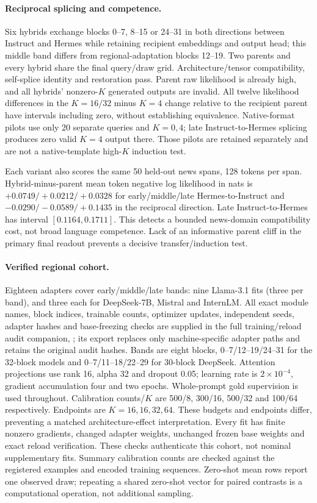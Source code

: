 \paragraph{Reciprocal splicing and competence.} Six hybrids exchange blocks 0--7, 8--15 or 24--31 in both directions between Instruct and Hermes while retaining recipient embeddings and output head; this middle band differs from regional-adaptation blocks 12--19. Two parents and every hybrid share the final query/draw grid. Architecture/tensor compatibility, self-splice identity and restoration pass. Parent raw likelihood is already high, and all hybrids' nonzero-$K$ generated outputs are invalid. All twelve likelihood differences in the $K=16/32$ minus $K=4$ change relative to the recipient parent have intervals including zero, without establishing equivalence. Native-format pilots use only 20 separate queries and $K=0,4$; late Instruct-to-Hermes splicing produces zero valid $K=4$ output there. Those pilots are retained separately and are not a native-template high-$K$ induction test.

Each variant also scores the same 50 held-out news spans, 128 tokens per span. Hybrid-minus-parent mean token negative log likelihood in nats is $+0.0749/+0.0212/+0.0328$ for early/middle/late Hermes-to-Instruct and $-0.0290/-0.0589/+0.1435$ in the reciprocal direction. Late Instruct-to-Hermes has interval $[0.1164,0.1711]$. This detects a bounded news-domain compatibility cost, not broad language competence. Lack of an informative parent cliff in the primary final readout prevents a decisive transfer/induction test.

\paragraph{Verified regional cohort.} Eighteen adapters cover early/middle/late bands: nine Llama-3.1 fits (three per band), and three each for DeepSeek-7B, Mistral and InternLM. All exact module names, block indices, trainable counts, optimizer updates, independent seeds, adapter hashes and base-freezing checks are supplied in the full training/reload audit companion, ; its export replaces only machine-specific adapter paths and retains the original audit hashes. Bands are eight blocks, 0--7/12--19/24--31 for the 32-block models and 0--7/11--18/22--29 for 30-block DeepSeek. Attention projections use rank 16, alpha 32 and dropout 0.05; learning rate is $2\times10^{-4}$, gradient accumulation four and two epochs. Whole-prompt gold supervision is used throughout. Calibration counts/$K$ are 500/8, 300/16, 500/32 and 100/64 respectively. Endpoints are $K=16,16,32,64$. These budgets and endpoints differ, preventing a matched architecture-effect interpretation. Every fit has finite nonzero gradients, changed adapter weights, unchanged frozen base weights and exact reload verification. These checks authenticate this cohort, not nominal supplementary fits. Summary calibration counts are checked against the registered examples and encoded training sequences. Zero-shot mean rows report one observed draw; repeating a shared zero-shot vector for paired contrasts is a computational operation, not additional sampling.

